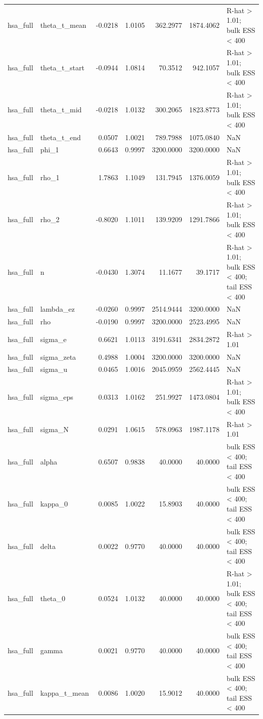 \begin{tabular}{llrrrrl}
hsa\_full & theta\_t\_mean & -0.0218 & 1.0105 & 362.2977 & 1874.4062 & R-hat > 1.01; bulk ESS < 400 \\
hsa\_full & theta\_t\_start & -0.0944 & 1.0814 & 70.3512 & 942.1057 & R-hat > 1.01; bulk ESS < 400 \\
hsa\_full & theta\_t\_mid & -0.0218 & 1.0132 & 300.2065 & 1823.8773 & R-hat > 1.01; bulk ESS < 400 \\
hsa\_full & theta\_t\_end & 0.0507 & 1.0021 & 789.7988 & 1075.0840 & NaN \\
hsa\_full & phi\_1 & 0.6643 & 0.9997 & 3200.0000 & 3200.0000 & NaN \\
hsa\_full & rho\_1 & 1.7863 & 1.1049 & 131.7945 & 1376.0059 & R-hat > 1.01; bulk ESS < 400 \\
hsa\_full & rho\_2 & -0.8020 & 1.1011 & 139.9209 & 1291.7866 & R-hat > 1.01; bulk ESS < 400 \\
hsa\_full & n & -0.0430 & 1.3074 & 11.1677 & 39.1717 & R-hat > 1.01; bulk ESS < 400; tail ESS < 400 \\
hsa\_full & lambda\_ez & -0.0260 & 0.9997 & 2514.9444 & 3200.0000 & NaN \\
hsa\_full & rho & -0.0190 & 0.9997 & 3200.0000 & 2523.4995 & NaN \\
hsa\_full & sigma\_e & 0.6621 & 1.0113 & 3191.6341 & 2834.2872 & R-hat > 1.01 \\
hsa\_full & sigma\_zeta & 0.4988 & 1.0004 & 3200.0000 & 3200.0000 & NaN \\
hsa\_full & sigma\_u & 0.0465 & 1.0016 & 2045.0959 & 2562.4445 & NaN \\
hsa\_full & sigma\_eps & 0.0313 & 1.0162 & 251.9927 & 1473.0804 & R-hat > 1.01; bulk ESS < 400 \\
hsa\_full & sigma\_N & 0.0291 & 1.0615 & 578.0963 & 1987.1178 & R-hat > 1.01 \\
hsa\_full & alpha & 0.6507 & 0.9838 & 40.0000 & 40.0000 & bulk ESS < 400; tail ESS < 400 \\
hsa\_full & kappa\_0 & 0.0085 & 1.0022 & 15.8903 & 40.0000 & bulk ESS < 400; tail ESS < 400 \\
hsa\_full & delta & 0.0022 & 0.9770 & 40.0000 & 40.0000 & bulk ESS < 400; tail ESS < 400 \\
hsa\_full & theta\_0 & 0.0524 & 1.0132 & 40.0000 & 40.0000 & R-hat > 1.01; bulk ESS < 400; tail ESS < 400 \\
hsa\_full & gamma & 0.0021 & 0.9770 & 40.0000 & 40.0000 & bulk ESS < 400; tail ESS < 400 \\
hsa\_full & kappa\_t\_mean & 0.0086 & 1.0020 & 15.9012 & 40.0000 & bulk ESS < 400; tail ESS < 400 \\

\end{tabular}
